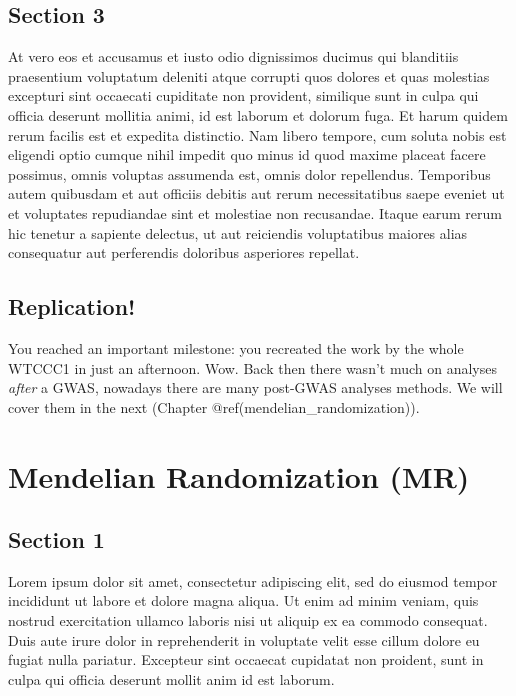 \documentclass[
]{book}
\begin{document}
\hypertarget{section-3-2}{%
\section{Section 3}\label{section-3-2}}

At vero eos et accusamus et iusto odio dignissimos ducimus qui blanditiis praesentium voluptatum deleniti atque corrupti quos dolores et quas molestias excepturi sint occaecati cupiditate non provident, similique sunt in culpa qui officia deserunt mollitia animi, id est laborum et dolorum fuga. Et harum quidem rerum facilis est et expedita distinctio. Nam libero tempore, cum soluta nobis est eligendi optio cumque nihil impedit quo minus id quod maxime placeat facere possimus, omnis voluptas assumenda est, omnis dolor repellendus. Temporibus autem quibusdam et aut officiis debitis aut rerum necessitatibus saepe eveniet ut et voluptates repudiandae sint et molestiae non recusandae. Itaque earum rerum hic tenetur a sapiente delectus, ut aut reiciendis voluptatibus maiores alias consequatur aut perferendis doloribus asperiores repellat.

\hypertarget{replication-4}{%
\section{Replication!}\label{replication-4}}

You reached an important milestone: you recreated the work by the whole WTCCC1 in just an afternoon. Wow. Back then there wasn't much on analyses \emph{after} a GWAS, nowadays there are many post-GWAS analyses methods. We will cover them in the next (Chapter @ref(mendelian\_randomization)).

\hypertarget{mendelian-randomization-mr}{%
\chapter{Mendelian Randomization (MR)}\label{mendelian-randomization-mr}}

\hypertarget{section-1-3}{%
\section{Section 1}\label{section-1-3}}

Lorem ipsum dolor sit amet, consectetur adipiscing elit, sed do eiusmod tempor incididunt ut labore et dolore magna aliqua. Ut enim ad minim veniam, quis nostrud exercitation ullamco laboris nisi ut aliquip ex ea commodo consequat. Duis aute irure dolor in reprehenderit in voluptate velit esse cillum dolore eu fugiat nulla pariatur. Excepteur sint occaecat cupidatat non proident, sunt in culpa qui officia deserunt mollit anim id est laborum.
\end{document}
